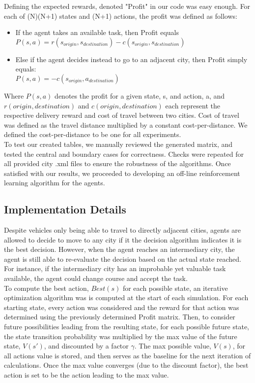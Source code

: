 \documentclass[11pt]{article}
\begin{document}
Defining the expected rewards, denoted "Profit" in our code was easy enough. For each of (N)(N+1) states and (N+1) actions, the profit was defined as follows: 
\begin{itemize}
	\item If the agent takes an available task, then Profit equals \\ 
	$ P(s,a)=r(s_{origin},s_{destination})-c(s_{origin},s_{destination}) $
	\item Else if the agent decides instead to go to an adjacent city, then Profit simply equals:\\ $P(s,a)=-c(s_{origin},a_{destination}) $
\end{itemize}
Where $P(s,a)$ denotes the profit for a given state, s, and action, a, and $r(origin,destination)$ and $c(origin,destination)$ each represent the respective delivery reward and cost of travel between two cities. Cost of travel was defined as the travel distance multiplied by a constant cost-per-distance. We defined the cost-per-distance to be one for all experiments.\\

To test our created tables, we manually reviewed the generated matrix, and tested the central and boundary cases for correctness. Checks were repeated for all provided city .xml files to ensure the robustness of the algorithms. Once satisfied with our results, we proceeded to developing an off-line reinforcement learning algorithm for the agents. 

\subsection{Implementation Details}
Despite vehicles only being able to travel to directly adjacent cities, agents are allowed to decide to move to any city if it the decision algorithm indicates it is the best decision. However, when the agent reaches an intermediary city, the agent is still able to re-evaluate the decision based on the actual state reached. For instance, if the intermediary city has an improbable yet valuable task available, the agent could change course and accept the task. \\

To compute the best action, $Best(s)$ for each possible state, an iterative optimization algorithm was is computed at the start of each simulation. For each starting state, every action was considered and the reward for that action was determined using the previously determined Profit matrix. Then, to consider future possibilities leading from the resulting state, for each possible future state, the state transition probability was multiplied by the max value of the future state, $V(s')$, and discounted by a factor $\gamma$. The max possible value, $V(s)$, for all actions value is stored, and then serves as the baseline for the next iteration of calculations. Once the max value converges (due to the discount factor), the best action is set to be the action leading to the max value. \\
\end{document}
